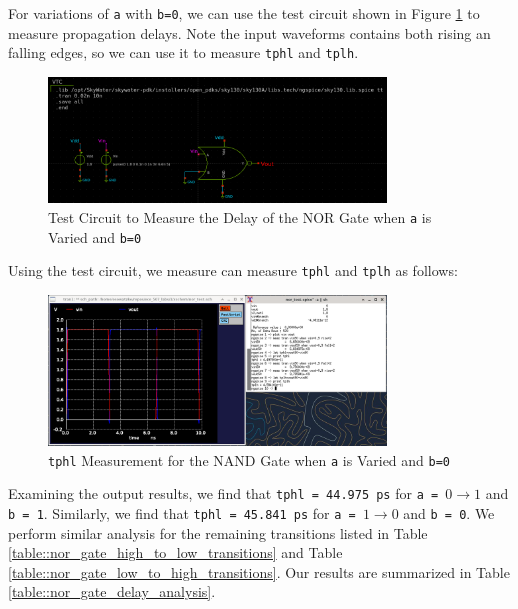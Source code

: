 \documentclass[fleqn]{article}
\begin{document}
	\noindent For variations of \texttt{a} with \texttt{b=0}, we can use the test circuit shown in Figure \ref{fig::nor_delay_test_sweep_va} to measure propagation delays. Note the input waveforms contains both rising an falling edges, so we can use it to measure \texttt{tphl} and \texttt{tplh}.

	\begin{figure}[H]
		\centerline{\includegraphics[width=0.8\textwidth]{nor_delay_test_sweep_va.png}}
		\caption{Test Circuit to Measure the Delay of the NOR Gate when \texttt{a} is Varied and \texttt{b=0}}
		\label{fig::nor_delay_test_sweep_va}
	\end{figure}
	
	\noindent Using the test circuit, we measure can measure \texttt{tphl} and \texttt{tplh} as follows:
	
	\begin{figure}[H]
		\centerline{\includegraphics[width=0.8\textwidth]{nor_delay_sweep_va.png}}
		\caption{\texttt{tphl} Measurement for the NAND Gate when \texttt{a} is Varied and \texttt{b=0}}
		\label{fig::nor_delay_sweep_va}
	\end{figure}
	
	Examining the output results, we find that \texttt{tphl = 44.975 ps} for \texttt{a = }$0 \rightarrow 1$ and \texttt{b = 1}. Similarly, we find that \texttt{tphl = 45.841 ps} for \texttt{a = }$1 \rightarrow 0$ and \texttt{b = 0}. We perform similar analysis for the remaining transitions listed in Table \ref{table::nor_gate_high_to_low_transitions} and Table \ref{table::nor_gate_low_to_high_transitions}. Our results are summarized in Table \ref{table::nor_gate_delay_analysis}.
	
\end{document}

